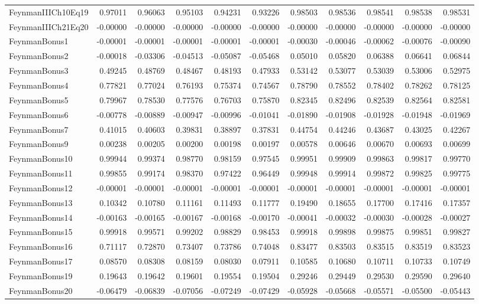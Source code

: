 \begin{tabular}{lrrrrrrrrrr}
FeynmanIIICh10Eq19 & 0.97011 & 0.96063 & 0.95103 & 0.94231 & 0.93226 & 0.98503 & 0.98536 & 0.98541 & 0.98538 & 0.98531 \\
FeynmanIIICh21Eq20 & -0.00000 & -0.00000 & -0.00000 & -0.00000 & -0.00000 & -0.00000 & -0.00000 & -0.00000 & -0.00000 & -0.00000 \\
FeynmanBonus1 & -0.00001 & -0.00001 & -0.00001 & -0.00001 & -0.00001 & -0.00030 & -0.00046 & -0.00062 & -0.00076 & -0.00090 \\
FeynmanBonus2 & -0.00018 & -0.03306 & -0.04513 & -0.05087 & -0.05468 & 0.05010 & 0.05820 & 0.06388 & 0.06641 & 0.06844 \\
FeynmanBonus3 & 0.49245 & 0.48769 & 0.48467 & 0.48193 & 0.47933 & 0.53142 & 0.53077 & 0.53039 & 0.53006 & 0.52975 \\
FeynmanBonus4 & 0.77821 & 0.77024 & 0.76193 & 0.75374 & 0.74567 & 0.78790 & 0.78552 & 0.78402 & 0.78262 & 0.78125 \\
FeynmanBonus5 & 0.79967 & 0.78530 & 0.77576 & 0.76703 & 0.75870 & 0.82345 & 0.82496 & 0.82539 & 0.82564 & 0.82581 \\
FeynmanBonus6 & -0.00778 & -0.00889 & -0.00947 & -0.00996 & -0.01041 & -0.01890 & -0.01908 & -0.01928 & -0.01948 & -0.01969 \\
FeynmanBonus7 & 0.41015 & 0.40603 & 0.39831 & 0.38897 & 0.37831 & 0.44754 & 0.44246 & 0.43687 & 0.43025 & 0.42267 \\
FeynmanBonus9 & 0.00238 & 0.00205 & 0.00200 & 0.00198 & 0.00197 & 0.00578 & 0.00646 & 0.00670 & 0.00693 & 0.00699 \\
FeynmanBonus10 & 0.99944 & 0.99374 & 0.98770 & 0.98159 & 0.97545 & 0.99951 & 0.99909 & 0.99863 & 0.99817 & 0.99770 \\
FeynmanBonus11 & 0.99855 & 0.99174 & 0.98370 & 0.97422 & 0.96449 & 0.99948 & 0.99914 & 0.99872 & 0.99825 & 0.99775 \\
FeynmanBonus12 & -0.00001 & -0.00001 & -0.00001 & -0.00001 & -0.00001 & -0.00001 & -0.00001 & -0.00001 & -0.00001 & -0.00001 \\
FeynmanBonus13 & 0.10342 & 0.10780 & 0.11161 & 0.11493 & 0.11777 & 0.19490 & 0.18655 & 0.17700 & 0.17416 & 0.17357 \\
FeynmanBonus14 & -0.00163 & -0.00165 & -0.00167 & -0.00168 & -0.00170 & -0.00041 & -0.00032 & -0.00030 & -0.00028 & -0.00027 \\
FeynmanBonus15 & 0.99918 & 0.99571 & 0.99202 & 0.98829 & 0.98453 & 0.99918 & 0.99898 & 0.99875 & 0.99851 & 0.99827 \\
FeynmanBonus16 & 0.71117 & 0.72870 & 0.73407 & 0.73786 & 0.74048 & 0.83477 & 0.83503 & 0.83515 & 0.83519 & 0.83523 \\
FeynmanBonus17 & 0.08570 & 0.08308 & 0.08159 & 0.08030 & 0.07911 & 0.10585 & 0.10680 & 0.10711 & 0.10733 & 0.10749 \\
FeynmanBonus19 & 0.19643 & 0.19642 & 0.19601 & 0.19554 & 0.19504 & 0.29246 & 0.29449 & 0.29530 & 0.29590 & 0.29640 \\
FeynmanBonus20 & -0.06479 & -0.06839 & -0.07056 & -0.07249 & -0.07429 & -0.05928 & -0.05668 & -0.05571 & -0.05500 & -0.05443 \\
\bottomrule
\end{tabular}
